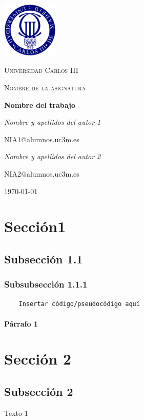 \documentclass[12pt,a4paper]{article}
\begin{document}
\begin{titlepage}
	\centering
	\includegraphics[width=0.2\textwidth]{images/logo}\par\vspace{1cm}
	{\scshape\LARGE Universidad Carlos III \par}
	\vspace{1cm}
	{\scshape\Large Nombre de la asignatura\par}
	\vspace{1.5cm}
	{\huge\bfseries Nombre del trabajo\par}
	\vspace{2cm}
	{\Large\itshape Nombre y apellidos del autor 1\par}
	{\Large NIA1@alumnos.uc3m.es\par}
	\vspace{1cm}
	{\Large\itshape Nombre y apellidos del autor 2\par}
	{\Large NIA2@alumnos.uc3m.es\par}
	\vfill
	
	{\large \today\par}
\end{titlepage}

\tableofcontents

\newpage
\section{Sección1}
\subsection{Subsección 1.1}
\vspace{0.3cm}
\subsubsection{Subsubsección 1.1.1}
\vspace{0.3cm}
\begin{verbatim}
    Insertar código/pseudocódigo aquí
\end{verbatim}
\vspace{0.3cm}
\paragraph{
   Párrafo 1 
}

\newpage
\section{Sección 2}
\subsection{Subsección 2}
\vspace{0.3cm}
Texto 1
\end{document}
